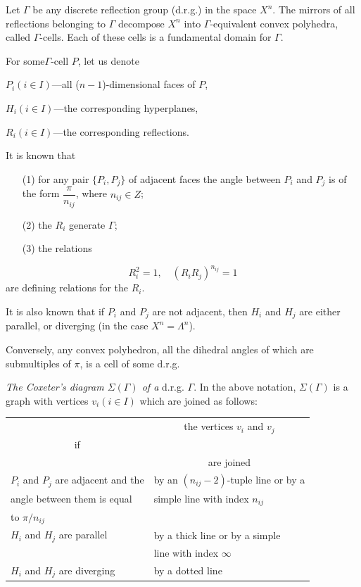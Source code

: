Let $\Gamma$ be any discrete reflection group (d.r.g.) in the space $X^n$. The mirrors of all reflections belonging to $\Gamma$ decompose $X^n$ into $\Gamma$-equivalent convex polyhedra, called $\Gamma$-cells. Each of these cells is a fundamental domain for $\Gamma$.
 
For some\pageoriginale $\Gamma$-cell $P$, let us denote

$P_i (i \in I)$---all ($n-1$)-dimensional faces of $P$,

$H_i(i \in I)$---the corresponding hyperplanes,

$R_i(i \in I)$---the corresponding reflections.

It is known that 
\begin{itemize}
\item[(1)] for any pair $\{P_i, P_j\}$ of adjacent faces the angle between $P_i$ and $P_j$ is of the form $\dfrac{\pi}{n_{ij}}$, where $n_{ij} \in Z$;

\item[(2)] the $R_i$ generate $\Gamma$;

\item[(3)] the relations 
\end{itemize}
$$
R^2_i = 1, \quad (R_i R_j)^{n_{ij}} =1
$$
are defining relations for the $R_i$.

It is also known \cite{art10-key9, art10-key10} that if $P_i$ and $P_j$ are not adjacent, then $H_i$ and $H_j$ are either parallel, or diverging (in the case $X^n = \Lambda^n$).

Conversely, any convex polyhedron, all the dihedral angles of which are submultiples of $\pi$, is a cell of some d.r.g.

\textit{The Coxeter's diagram $\Sigma (\Gamma)$ of a} d.r.g. $\Gamma$. In the above notation, $\Sigma (\Gamma)$ is a graph with vertices $v_i (i \in I)$ which are joined as follows:
{
\tabcolsep=3pt
\begin{longtable}{@{}l|l@{}}
\hline
&  \multicolumn{1}{c}{the vertices $v_i$ and $v_j$} \\[-0.4cm]
\multicolumn{1}{c|}{if} & \\
& \multicolumn{1}{c}{are joined} \\\hline
$P_i$ and $P_j$ are adjacent and the & by an $(n_{ij}-2)$-tuple line or by a \\
angle between them is equal  & simple line with index $n_{ij}$\\
to $\pi / n_{ij}$ & \\\hline
$H_i$ and $H_j$ are parallel & by a thick line or by a simple\\
& line with index $\infty$\\\hline
$H_i$ and $H_j$ are diverging & by a dotted line\\\hline
\end{longtable}}\relax

